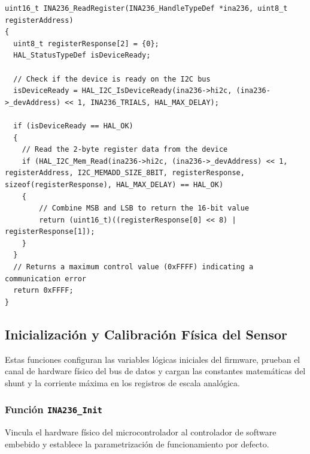 \documentclass[
10pt, %
a4paper, %
oneside, %
headinclude,footinclude, %
BCOR5mm, %
]{scrartcl}
\begin{document}
\begin{lstlisting}[style=CMakeStyle]
uint16_t INA236_ReadRegister(INA236_HandleTypeDef *ina236, uint8_t registerAddress)
{
  uint8_t registerResponse[2] = {0}; 
  HAL_StatusTypeDef isDeviceReady;   

  // Check if the device is ready on the I2C bus
  isDeviceReady = HAL_I2C_IsDeviceReady(ina236->hi2c, (ina236->_devAddress) << 1, INA236_TRIALS, HAL_MAX_DELAY);

  if (isDeviceReady == HAL_OK)
  {
    // Read the 2-byte register data from the device
    if (HAL_I2C_Mem_Read(ina236->hi2c, (ina236->_devAddress) << 1, registerAddress, I2C_MEMADD_SIZE_8BIT, registerResponse, sizeof(registerResponse), HAL_MAX_DELAY) == HAL_OK)
    {
        // Combine MSB and LSB to return the 16-bit value
        return (uint16_t)((registerResponse[0] << 8) | registerResponse[1]);
    }    
  }
  // Returns a maximum control value (0xFFFF) indicating a communication error
  return 0xFFFF;
}
\end{lstlisting}

\subsection{Inicialización y Calibración Física del Sensor}
Estas funciones configuran las variables lógicas iniciales del firmware, prueban el canal de hardware físico del bus de datos y cargan las constantes matemáticas del shunt y la corriente máxima en los registros de escala analógica.

\subsubsection{Función \texttt{INA236\_Init}}
Vincula el hardware físico del microcontrolador al controlador de software embebido y establece la parametrización de funcionamiento por defecto.
\end{document}

